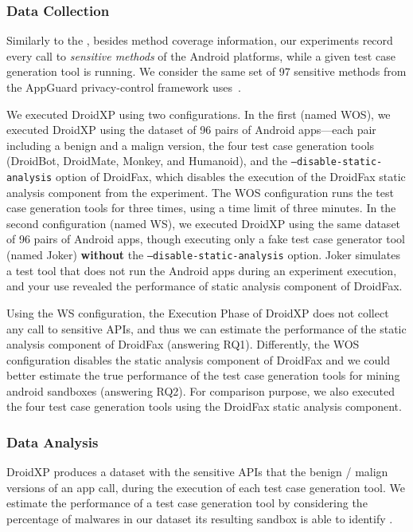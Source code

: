 \subsubsection{Data Collection}

Similarly to the \blls, besides
method coverage information, our experiments record every call
to \emph{sensitive methods} of the Android
platforms, while a given test case generation tool
is running. We consider the
same set of 97 sensitive methods 
from the AppGuard privacy-control framework
uses~\cite{DBLP:conf/esorics/BackesGHMS13}.

We executed DroidXP using two
configurations. In the first (named WOS), we executed DroidXP
using the dataset of 96 pairs of Android apps---each pair
including a benign and a malign version,
the four test case generation tools (DroidBot, DroidMate, Monkey, and Humanoid),
and the \texttt{--disable-static-analysis} option of
DroidFax, which disables the
execution of the DroidFax static analysis
component from the experiment. The WOS configuration
runs the test case generation tools for three times, using
a time limit of three minutes. 
In the second configuration (named WS), we executed DroidXP
using the same dataset of 96 pairs of Android apps, though 
executing only a fake test case generator tool (named Joker)
{\bf without} the \texttt{--disable-static-analysis} option.
Joker simulates a test tool that does not
run the Android apps during an experiment execution, and your use revealed the performance of static analysis component of DroidFax.

Using the WS configuration, the Execution Phase of
DroidXP does not collect any call to 
sensitive APIs, and thus we can estimate the performance of the
static analysis component of DroidFax (answering
RQ1).
Differently, the WOS configuration
disables the static analysis component of DroidFax and
we could better estimate the true performance of the test
case generation tools for mining android sandboxes 
(answering RQ2). For comparison purpose, we also
executed the four test case generation tools using the
DroidFax static analysis component. 


\subsubsection{Data Analysis} 

DroidXP produces a
dataset with the sensitive
APIs that the benign / malign
versions of an app call, during
the execution of each test case
generation tool. We estimate the
performance of a test case generation
tool by considering the percentage of
malwares in our dataset
its resulting sandbox is able to identify .

